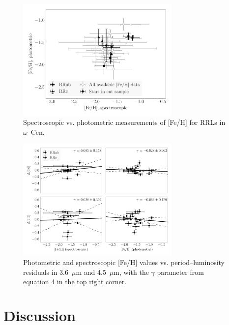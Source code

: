 \documentclass[a4paper,fleqn,usenatbib]{mnras}
\begin{document}
\begin{figure}
\begin{center}
\includegraphics[width=80mm]{reworked_fitting_code/final_plots/metallicity_comparison_all_clipped.pdf}
\caption{Spectroscopic vs. photometric measurements of [Fe/H] for RRLs in $\omega$~Cen.}
\label{fig:metallicity_comparison}
\end{center}
\end{figure}


\begin{figure}
\begin{center}
\includegraphics[width=80mm]{reworked_fitting_code/final_plots/metallicity_vs_residuals_m4_clipped.pdf}
\caption{Photometric and spectroscopic [Fe/H] values vs. period--luminosity residuals in 3.6~$\mu$m and 4.5~$\mu$m, with the $\gamma$ parameter from equation 4 in the top right corner.}
\label{fig:metallicity_residuals}
\end{center}
\end{figure}


\section{Discussion}
\label{sec:discussion}

\end{document}

